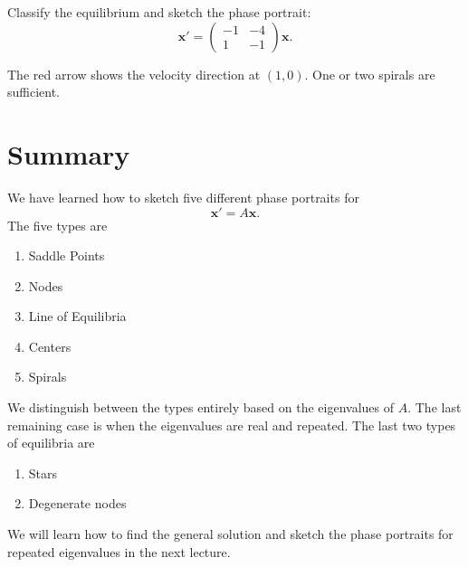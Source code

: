 \documentclass[11pt,letterpaper]{article}
\begin{document}
\begin{example}[6]{
Classify the equilibrium and sketch the phase portrait:
\[
\mathbf{x}'=
\begin{pmatrix}
-1&-4\\
1&-1
\end{pmatrix}\mathbf{x}.
\]
}
\begin{center}
\end{center}
The red arrow shows the velocity direction at $(1,0)$. One or two spirals are sufficient.
\end{example}

\section{Summary}

We have learned how to sketch five different phase portraits for 
$$
    \textbf{x}' = A\textbf{x}.
$$
The five types are 
\begin{enumerate}
    \item Saddle Points
    \item Nodes 
    \item Line of Equilibria
    \item Centers
    \item Spirals
\end{enumerate}
We distinguish between the types entirely based on the eigenvalues of $A$. The last remaining case is when the eigenvalues are real and repeated. The last two types of equilibria are
\begin{enumerate}
    \item[7.] Stars
    \item[8.] Degenerate nodes
\end{enumerate}
We will learn how to find the general solution and sketch the phase portraits for repeated eigenvalues in the next lecture.
\end{document}
